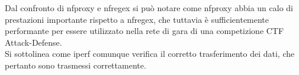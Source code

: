 Dal confronto di nfproxy e nfregex si può notare come nfproxy abbia un calo di prestazioni importante rispetto a nfregex, che tuttavia
è sufficientemente performante per essere utilizzato nella rete di gara di una competizione CTF Attack-Defense.\\
Si sottolinea come iperf comunque verifica il corretto trasferimento dei dati, che pertanto sono trasmessi correttamente.
